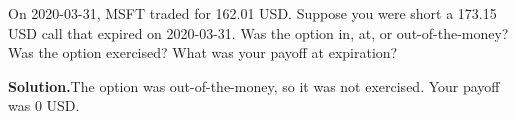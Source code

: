 \noindent On 2020-03-31, MSFT traded for 162.01 USD. Suppose you were short a 173.15 USD call that expired on 2020-03-31. Was the option in, at, or out-of-the-money? Was the option exercised? What was your payoff at expiration?

\vspace{9pt} 

\textbf{Solution.}The option was out-of-the-money, so it was not exercised. Your payoff was 0 USD.
